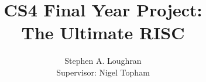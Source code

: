 

\title{CS4 Final Year Project: \\
{\bf The Ultimate RISC}}
\author{Stephen A. Loughran\\
Supervisor: Nigel Topham}
\maketitle

